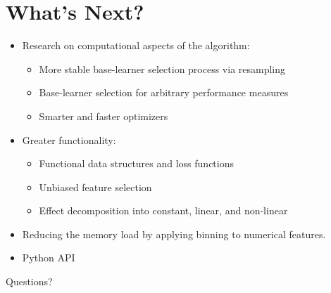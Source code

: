 \documentclass[10pt]{beamer}\usepackage[]{graphicx}\usepackage[]{color}
\begin{document}
\section{What's Next?}

\begin{frame}

\begin{itemize}
  \item
    Research on computational aspects of the algorithm:
    \begin{itemize}
      \item
        More stable base-learner selection process via resampling
      \item
        Base-learner selection for arbitrary performance measures
      \item
        Smarter and faster optimizers
    \end{itemize}

  \item
    Greater functionality:
    \begin{itemize}
      \item
        Functional data structures and loss functions
      \item
        Unbiased feature selection
      \item
        Effect decomposition into constant, linear, and non-linear
    \end{itemize}

    \item
      Reducing the memory load by applying binning to numerical features.

    \item
      Python API
\end{itemize}

\end{frame}



\begin{frame}
  Questions?
\end{frame}
\end{document}
